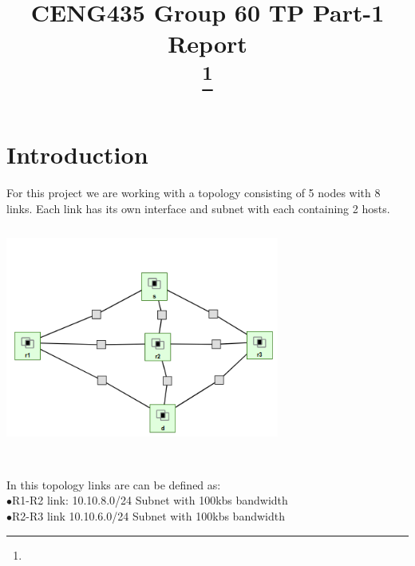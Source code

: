 \documentclass[conference]{IEEEtran}
\begin{document}
\title{CENG435 Group 60 TP Part-1 Report\\
\thanks{}
}

\author{
\and
{}

}

\maketitle





\section{Introduction}
\large

For this project we are working with a topology consisting of 5 nodes with 8 links. Each link has its own interface and subnet with each containing 2 hosts. \\
\includegraphics[width = 90mm, height = 80mm]{topology.png}\\ \qquad \\


In this topology links are can be defined as:\\

$\bullet$R1-R2 link: 10.10.8.0/24 Subnet with 100kbs bandwidth\\

$\bullet$R2-R3 link 10.10.6.0/24 Subnet with 100kbs bandwidth\\
\end{document}
